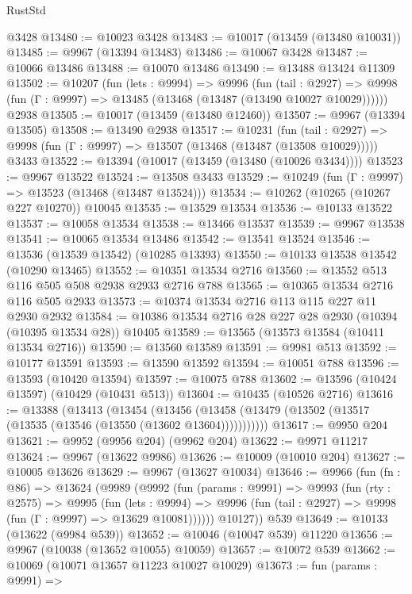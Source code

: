 \begin{lexlean}{RustStd}
\begin{coremodule}
{\begin{coremodule}
{{{{{{{{{{{{{{{{{{{{{{{{{{{{{{{{{{{{{{{{{{{{{{{{{{{{{{{{{{{{{{{{{{{{{{{{{{{{{{    @3428
@13480 := @10023 @3428
@13483 := @10017 (@13459 (@13480 @10031))
@13485 := @9967 (@13394 @13483)
@13486 := @10067 @3428
@13487 := @10066 @13486
@13488 := @10070 @13486
@13490 := @13488 @13424 @11309
@13502 := @10207
    (fun (lets : @9994) =>
    @9996
      (fun (tail : @2927) =>
      @9998 (fun (Γ : @9997) => @13485 (@13468 (@13487 (@13490 @10027 @10029))))))
    @2938
@13505 := @10017 (@13459 (@13480 @12460))
@13507 := @9967 (@13394 @13505)
@13508 := @13490 @2938
@13517 := @10231
    (fun (tail : @2927) => @9998 (fun (Γ : @9997) => @13507 (@13468 (@13487 (@13508 @10029)))))
    @3433
@13522 := @13394 (@10017 (@13459 (@13480 (@10026 @3434))))
@13523 := @9967 @13522
@13524 := @13508 @3433
@13529 := @10249 (fun (Γ : @9997) => @13523 (@13468 (@13487 @13524)))
@13534 := @10262 (@10265 (@10267 @227 @10270)) @10045
@13535 := @13529 @13534
@13536 := @10133 @13522
@13537 := @10058 @13534
@13538 := @13466 @13537
@13539 := @9967 @13538
@13541 := @10065 @13534 @13486
@13542 := @13541 @13524
@13546 := @13536 (@13539 @13542) (@10285 @13393)
@13550 := @10133 @13538 @13542 (@10290 @13465)
@13552 := @10351 @13534 @2716
@13560 := @13552 @513 @116 @505 @508 @2938 @2933 @2716 @788
@13565 := @10365 @13534 @2716 @116 @505 @2933
@13573 := @10374 @13534 @2716 @113 @115 @227 @11 @2930 @2932
@13584 := @10386 @13534 @2716 @28 @227 @28 @2930 (@10394 (@10395 @13534 @28)) @10405
@13589 := @13565 (@13573 @13584 (@10411 @13534 @2716))
@13590 := @13560 @13589
@13591 := @9981 @513
@13592 := @10177 @13591
@13593 := @13590 @13592
@13594 := @10051 @788
@13596 := @13593 (@10420 @13594)
@13597 := @10075 @788
@13602 := @13596 (@10424 @13597) (@10429 (@10431 @513))
@13604 := @10435 (@10526 @2716)
@13616 := @13388
    (@13413
      (@13454
        (@13456 (@13458 (@13479 (@13502 (@13517 (@13535 (@13546 (@13550 (@13602 @13604)))))))))))
@13617 := @9950 @204
@13621 := @9952 (@9956 @204) (@9962 @204)
@13622 := @9971 @11217
@13624 := @9967 (@13622 @9986)
@13626 := @10009 (@10010 @204)
@13627 := @10005 @13626
@13629 := @9967 (@13627 @10034)
@13646 := @9966
    (fun (fn : @86) =>
    @13624
      (@9989
        (@9992
          (fun (params : @9991) =>
          @9993
            (fun (rty : @2575) =>
            @9995
              (fun (lets : @9994) =>
              @9996 (fun (tail : @2927) => @9998 (fun (Γ : @9997) => @13629 @10081))))))
        @10127))
    @539
@13649 := @10133 (@13622 (@9984 @539))
@13652 := @10046 (@10047 @539) @11220
@13656 := @9967 (@10038 (@13652 @10055) @10059)
@13657 := @10072 @539
@13662 := @10069 (@10071 @13657 @11223 @10027 @10029)
@13673 := fun (params : @9991) =>
}}}}}}}}}}}}}}}}}}}}}}}}}}}}}}}}}}}}}}}}}}}}}}}}}}}}}}}}}}}}}}}}}}}}}}}}}}}}}}
\end{coremodule}}
\end{coremodule}
\end{lexlean}

